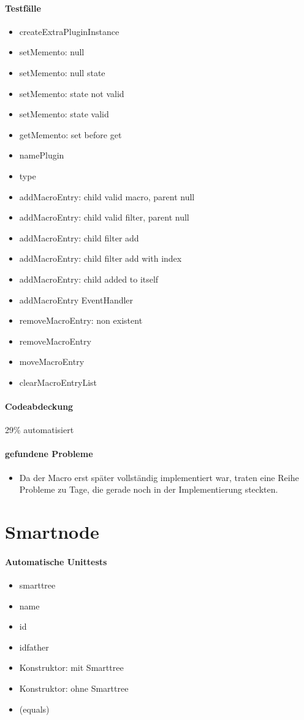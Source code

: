 \paragraph*{Testfälle}
\begin{itemize}
\item createExtraPluginInstance
\item setMemento: null
\item setMemento: null state
\item setMemento: state not valid
\item setMemento: state valid
\item getMemento: set before get
\item namePlugin
\item type
\item addMacroEntry: child valid macro, parent null
\item addMacroEntry: child valid filter, parent null
\item addMacroEntry: child filter add
\item addMacroEntry: child filter add with index
\item addMacroEntry: child added to itself
\item addMacroEntry EventHandler
\item removeMacroEntry: non existent
\item removeMacroEntry
\item moveMacroEntry
\item clearMacroEntryList
\end{itemize}
\paragraph*{Codeabdeckung}
29\% automatisiert
\paragraph*{gefundene Probleme}
\begin{itemize}
\item Da der Macro erst später vollständig implementiert war, traten eine Reihe Probleme zu Tage, die gerade noch in der Implementierung steckten.
\end{itemize}





\section{Smartnode}
\paragraph{Automatische Unittests}
\begin{itemize}
\item smarttree
\item name
\item id
\item idfather
\item Konstruktor: mit Smarttree
\item Konstruktor: ohne Smarttree
\item (equals)
\end{itemize}

